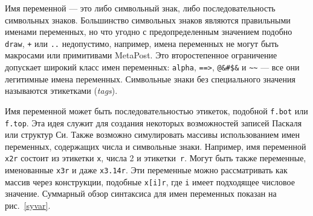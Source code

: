 \documentclass{article} %
\begin{document}
Имя переменной --- это либо символьный знак, либо последовательность 
символьных знаков.
Большинство символьных знаков являются правильными именами переменных, но 
что угодно с предопределенным значением подобно {\tt draw}, {\tt +} или {\tt ..} 
недопустимо, например, имена переменных не могут быть макросами или 
примитивами MetaPost. 
Это второстепенное ограничение допускает широкий класс имен переменных: 
{\tt alpha}, \verb|==>|, \verb|@&#$&| и \verb|~~| --- все они легитимные 
имена переменных.
Символьные знаки без специального значения называются этикетками  
({\em tags}).

Имя переменной может быть последовательностью этикеток, подобной 
{\tt f.bot} или {\tt f.top}.
Эта идея служит для создания некоторых возможностей записей Паскаля 
или структур Си.
Также возможно симулировать массивы использованием имен переменных, 
содержащих числа и символьные знаки.
Например, имя переменной {\tt x2r} состоит из этикетки {\tt x}, 
числа 2 и этикетки~{\tt r}.
Могут быть также переменные, именованные {\tt x3r} и даже {\tt x3.14r}.
Эти переменные можно рассматривать как массив через конструкции, 
подобные {\tt x[i]r}, где {\tt i} имеет подходящее числовое значение. 
Суммарный обзор синтаксиса для имен переменных показан на рис.~\ref{syvar}.
\end{document}
